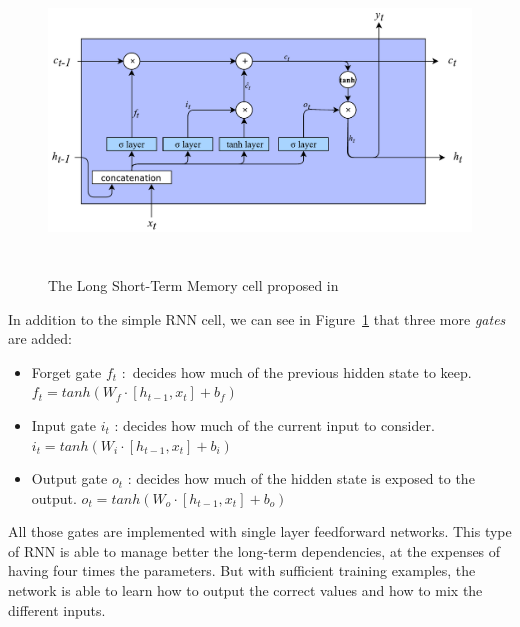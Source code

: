 
\begin{figure}[!htbp]
    \centering
    \includegraphics[max width=\linewidth,max height=8cm,keepaspectratio]{figures/LSTM}
    \caption{The Long Short-Term Memory cell proposed in~\cite{hochreiter1997long}}\label{fig:LSTM}
\end{figure}

In addition to the simple RNN cell, we can see in Figure~\ref{fig:LSTM} that three more \textit{gates} are added:

\begin{itemize}
	\item Forget gate  \( f_{t} \) :\ decides how much of the previous hidden state to keep.   \( f_{t}=tanh \left( W_{f}\cdot  \left[ h_{t-1}, x_{t} \right]  + b_{f} \right)  \) 

	\item Input gate  \( i_{t} \) : decides how much of the current input to consider.  \( i_{t}=tanh \left( W_{i}\cdot  \left[ h_{t-1}, x_{t} \right]  + b_{i} \right)  \) 

	\item Output gate  \( o_{t} \) : decides how much of the hidden state is exposed to the output.  \( o_{t}=tanh \left( W_{o}\cdot  \left[ h_{t-1}, x_{t} \right]  + b_{o} \right)  \) 
\end{itemize}

All those gates are implemented with single layer feedforward networks. This type of RNN is able to manage better the long-term dependencies, at the expenses of having four times the parameters. But with sufficient training examples, the network is able to learn how to output the correct values and how to mix the different inputs.

